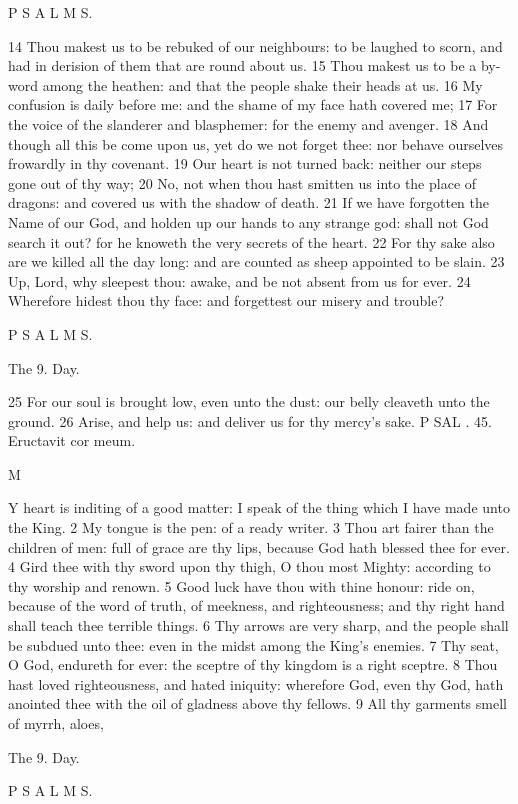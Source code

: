 P S A L M S.

14 Thou makest us to be rebuked of our neighbours: to be laughed to scorn, and had in derision of them that are round about us. 15 Thou makest us to be a by-word among the heathen: and that the people shake their heads at us. 16 My confusion is daily before me: and the shame of my face hath covered me; 17 For the voice of the slanderer and blasphemer: for the enemy and avenger. 18 And though all this be come upon us, yet do we not forget thee: nor behave ourselves frowardly in thy covenant. 19 Our heart is not turned back: neither our steps gone out of thy way; 20 No, not when thou hast smitten us into the place of dragons: and covered us with the shadow of death. 21 If we have forgotten the Name of our God, and holden up our hands to any strange god: shall not God search it out? for he knoweth the very secrets of the heart. 22 For thy sake also are we killed all the day long: and are counted as sheep appointed to be slain. 23 Up, Lord, why sleepest thou: awake, and be not absent from us for ever. 24 Wherefore hidest thou thy face: and forgettest our misery and trouble?

P S A L M S.

The 9. Day.

25 For our soul is brought low, even unto the dust: our belly cleaveth unto the ground. 26 Arise, and help us: and deliver us for thy mercy’s sake. P SAL . 45. Eructavit cor meum.

M

Y heart is inditing of a good matter: I speak of the thing which I have made unto the King. 2 My tongue is the pen: of a ready writer. 3 Thou art fairer than the children of men: full of grace are thy lips, because God hath blessed thee for ever. 4 Gird thee with thy sword upon thy thigh, O thou most Mighty: according to thy worship and renown. 5 Good luck have thou with thine honour: ride on, because of the word of truth, of meekness, and righteousness; and thy right hand shall teach thee terrible things. 6 Thy arrows are very sharp, and the people shall be subdued unto thee: even in the midst among the King’s enemies. 7 Thy seat, O God, endureth for ever: the sceptre of thy kingdom is a right sceptre. 8 Thou hast loved righteousness, and hated iniquity: wherefore God, even thy God, hath anointed thee with the oil of gladness above thy fellows. 9 All thy garments smell of myrrh, aloes,

The 9. Day.

P S A L M S.

